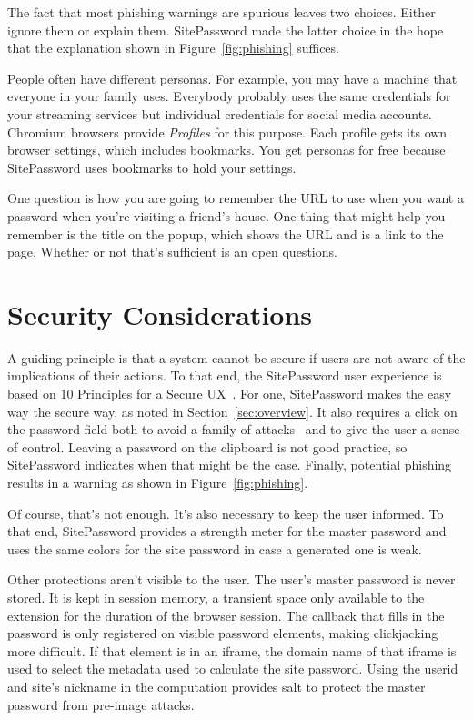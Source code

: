 The fact that most phishing warnings are spurious leaves two choices.  Either ignore them or explain them.  SitePassword made the latter choice in the hope that the explanation shown in Figure~\ref{fig:phishing} suffices.  

People often have different personas.  For example, you may have a machine that everyone in your family uses.  Everybody probably uses the same credentials for your streaming services but individual credentials for social media accounts.  Chromium browsers provide {\em Profiles} for this purpose.  Each profile gets its own browser settings, which includes bookmarks.  You get personas for free because SitePassword uses bookmarks to hold your settings.

One question is how you are going to remember the URL to use when you want a password when you're visiting a friend's house.  One thing that might help you remember is the title on the popup, which shows the URL and is a link to the page.  Whether or not that's sufficient is an open questions.

\section{Security Considerations}\label{sec:security}

A guiding principle is that a system cannot be secure if users are not aware of the implications of their actions.  To that end, the SitePassword user experience is based on 10 Principles for a Secure UX~\cite{10principles}.  For one, SitePassword makes the easy way the secure way, as noted in Section~\ref{sec:overview}.  It also requires a click on the password field both to avoid a family of attacks~\cite{silver2014password} and to give the user a sense of control.  Leaving a password on the clipboard is not good practice, so SitePassword indicates when that might be the case.  Finally, potential phishing results in a warning as shown in Figure~\ref{fig:phishing}.

Of course, that's not enough.  It's also necessary to keep the user informed.  To that end, SitePassword provides a strength meter for the master password and uses the same colors for the site password in case a generated one is weak.

Other protections aren't visible to the user.  The user's master password is never stored.  It is kept in session memory, a transient space only available to the extension for the duration of the browser session.  The callback that fills in the password is only registered on visible password elements, making clickjacking more difficult.  If that element is in an iframe, the domain name of that iframe is used to select the metadata used to calculate the site password.  Using the userid and site's nickname in the computation provides salt to protect the master password from pre-image attacks.

